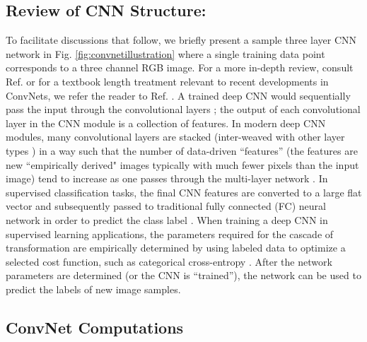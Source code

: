 \documentclass[%
reprint,
superscriptaddress,
 aps,
 pre,
]{revtex4-1}
\begin{document}
\subsection{Review of CNN Structure:}   To facilitate discussions that follow, we briefly present a sample three layer CNN network in Fig. \ref{fig:convnetillustration} where a single training data point corresponds to a three channel RGB image.  For a more in-depth review, consult Ref. \cite{LeCun2015} or for a textbook length treatment relevant to recent developments in ConvNets, we refer the reader to Ref. \cite{GoodfellowBook}.
A trained deep CNN would sequentially pass the input through 
the  convolutional layers \cite{LeCun2015};  the output of each convolutional layer in the CNN module is a collection of features.  In modern deep CNN modules, many convolutional layers  are stacked (inter-weaved with other layer types \cite{LeCun2015}) in a way such that the number of data-driven ``features'' 
(the features are new  ``empirically derived" images typically with much fewer pixels than the input image) 
tend to increase as one passes through the multi-layer network \cite{Krizhevsky2012,LeCun2015}.
In supervised classification tasks, the final CNN features are converted to a large flat vector and subsequently  passed to traditional fully connected (FC) neural network in order to predict the class label \cite{BishopNN,GoodfellowBook}.
When training a deep CNN in supervised learning applications, the parameters required for the cascade of transformation are empirically determined by using labeled data
to  optimize a selected cost function, such as categorical cross-entropy  \cite{BishopNN}.  
After the network parameters are determined (or the CNN is ``trained''), the network can be used to predict the labels of new image samples.  

 \subsection{ConvNet Computations}
 \label{sec:convnetdetails}
\end{document}
